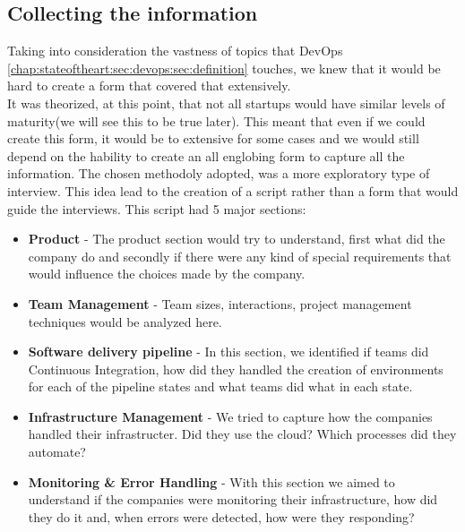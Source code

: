       \subsection{Collecting the information}
      Taking into consideration the vastness of topics that DevOps \ref{chap:stateoftheart:sec:devops:sec:definition} touches, we knew that it would be hard to create a form that covered that extensively.\\
      It was theorized, at this point, that not all startups would have similar levels of maturity(we will see this to be true later). This meant that even if we could create this form, it would be to extensive for some cases and we would still depend on the hability to create an all englobing form to capture all the information.
      The chosen methodoly adopted, was a more exploratory type of interview. This idea lead to the creation of a script rather than a form that would guide the interviews. This script had 5 major sections:
      \begin{itemize}
          \item \textbf{Product} - The product section would try to understand, first what did the company do and secondly if there were any kind of special requirements that would influence the choices made by the company.
          \item \textbf{Team Management} - Team sizes, interactions, project management techniques would be analyzed here.
          \item \textbf{Software delivery pipeline} - In this section, we identified if teams did Continuous Integration, how did they handled the creation of environments for each of the pipeline states and what teams did what in each state.
          \item \textbf{Infrastructure Management} - We tried to capture how the companies handled their infrastructer. Did they use the cloud? Which processes did they automate?
          \item \textbf{Monitoring \& Error Handling} - With this section we aimed to understand if the companies were monitoring their infrastructure, how did they do it and, when errors were detected, how were they responding?
      \end{itemize}

